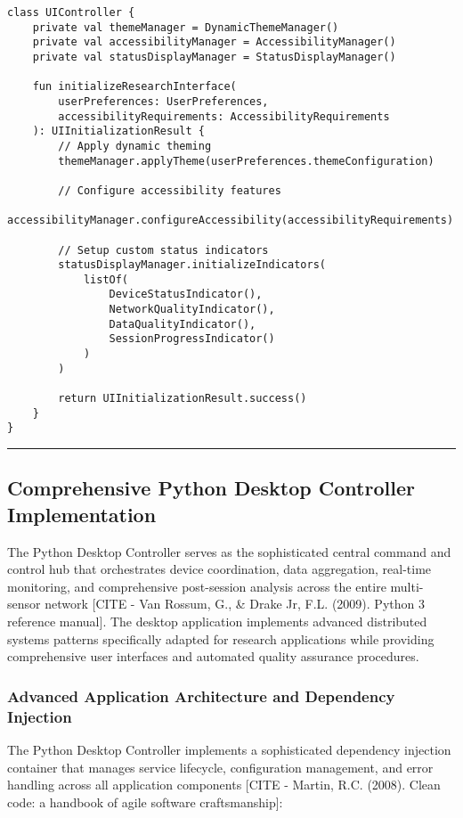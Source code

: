 \documentclass[12pt,a4paper]{report}
\begin{document}
\begin{verbatim}
class UIController {
    private val themeManager = DynamicThemeManager()
    private val accessibilityManager = AccessibilityManager()
    private val statusDisplayManager = StatusDisplayManager()

    fun initializeResearchInterface(
        userPreferences: UserPreferences,
        accessibilityRequirements: AccessibilityRequirements
    ): UIInitializationResult {
        // Apply dynamic theming
        themeManager.applyTheme(userPreferences.themeConfiguration)

        // Configure accessibility features
        accessibilityManager.configureAccessibility(accessibilityRequirements)

        // Setup custom status indicators
        statusDisplayManager.initializeIndicators(
            listOf(
                DeviceStatusIndicator(),
                NetworkQualityIndicator(),
                DataQualityIndicator(),
                SessionProgressIndicator()
            )
        )

        return UIInitializationResult.success()
    }
}
\end{verbatim}

\hrule

\subsection{Comprehensive Python Desktop Controller Implementation}

The Python Desktop Controller serves as the sophisticated central command and control hub that orchestrates device
coordination, data aggregation, real-time monitoring, and comprehensive post-session analysis across the entire
multi-sensor network [CITE - Van Rossum, G., \& Drake Jr, F.L. (2009). Python 3 reference manual]. The desktop
application implements advanced distributed systems patterns specifically adapted for research applications while
providing comprehensive user interfaces and automated quality assurance procedures.

\subsubsection{Advanced Application Architecture and Dependency Injection}

The Python Desktop Controller implements a sophisticated dependency injection container that manages service lifecycle,
configuration management, and error handling across all application
components [CITE - Martin, R.C. (2008). Clean code: a handbook of agile software craftsmanship]:
\end{document}

